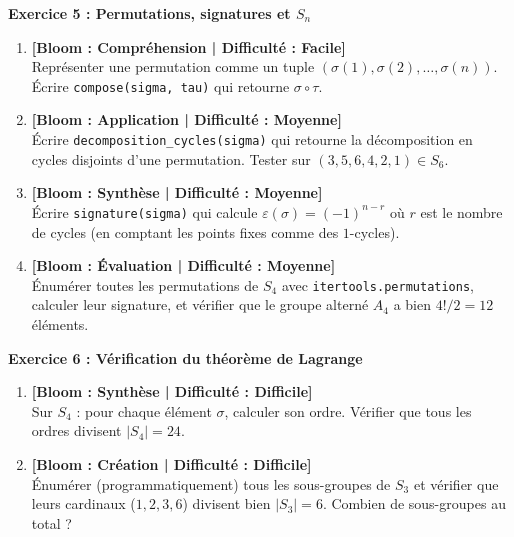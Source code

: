 \documentclass[12pt,a4paper]{report}
\theoremstyle{definition}
\theoremstyle{remark}
\begin{document}
\noindent\textbf{Exercice 5 : Permutations, signatures et $S_n$}
\begin{enumerate}
    \item \textbf{[Bloom : Compréhension | Difficulté : Facile]} \\
    Représenter une permutation comme un tuple $(\sigma(1), \sigma(2), \dots, \sigma(n))$. Écrire \texttt{compose(sigma, tau)} qui retourne $\sigma \circ \tau$.
    \item \textbf{[Bloom : Application | Difficulté : Moyenne]} \\
    Écrire \texttt{decomposition\_cycles(sigma)} qui retourne la décomposition en cycles disjoints d'une permutation. Tester sur $(3, 5, 6, 4, 2, 1) \in S_6$.
    \item \textbf{[Bloom : Synthèse | Difficulté : Moyenne]} \\
    Écrire \texttt{signature(sigma)} qui calcule $\varepsilon(\sigma) = (-1)^{n - r}$ où $r$ est le nombre de cycles (en comptant les points fixes comme des $1$-cycles).
    \item \textbf{[Bloom : Évaluation | Difficulté : Moyenne]} \\
    Énumérer toutes les permutations de $S_4$ avec \texttt{itertools.permutations}, calculer leur signature, et vérifier que le groupe alterné $A_4$ a bien $4! / 2 = 12$ éléments.
\end{enumerate}

\vspace{0.3cm}

\noindent\textbf{Exercice 6 : Vérification du théorème de Lagrange}
\begin{enumerate}
    \item \textbf{[Bloom : Synthèse | Difficulté : Difficile]} \\
    Sur $S_4$ : pour chaque élément $\sigma$, calculer son ordre. Vérifier que tous les ordres divisent $|S_4| = 24$.
    \item \textbf{[Bloom : Création | Difficulté : Difficile]} \\
    Énumérer (programmatiquement) tous les sous-groupes de $S_3$ et vérifier que leurs cardinaux ($1, 2, 3, 6$) divisent bien $|S_3| = 6$. Combien de sous-groupes au total ?
\end{enumerate}

\vspace{0.3cm}
\end{document}
